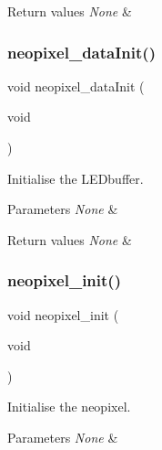 \begin{DoxyRetVals}{Return values}
{\em None} & \\
\hline
\end{DoxyRetVals}
\mbox{\label{group___neo_pixel_ga79e34feddcfb2c45ae218166c84bdff4}} 
\subsubsection{\texorpdfstring{neopixel\+\_\+data\+Init()}{neopixel\_dataInit()}}
{\footnotesize\ttfamily void neopixel\+\_\+data\+Init (\begin{DoxyParamCaption}\item[{void}]{ }\end{DoxyParamCaption})}



Initialise the L\+E\+Dbuffer. 


\begin{DoxyParams}{Parameters}
{\em None} & \\
\hline
\end{DoxyParams}

\begin{DoxyRetVals}{Return values}
{\em None} & \\
\hline
\end{DoxyRetVals}
\mbox{\label{group___neo_pixel_gaac78468985e44a3e4d353ea9276b33bc}} 
\subsubsection{\texorpdfstring{neopixel\+\_\+init()}{neopixel\_init()}}
{\footnotesize\ttfamily void neopixel\+\_\+init (\begin{DoxyParamCaption}\item[{void}]{ }\end{DoxyParamCaption})}



Initialise the neopixel. 


\begin{DoxyParams}{Parameters}
{\em None} & \\
\hline
\end{DoxyParams}

